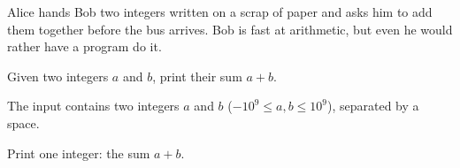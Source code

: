 Alice hands Bob two integers written on a scrap of paper and asks him to add
them together before the bus arrives. Bob is fast at arithmetic, but even he
would rather have a program do it.

Given two integers $a$ and $b$, print their sum $a + b$.

\InputFile

The input contains two integers $a$ and $b$
($-10^9 \le a, b \le 10^9$), separated by a space.

\OutputFile

Print one integer: the sum $a + b$.
